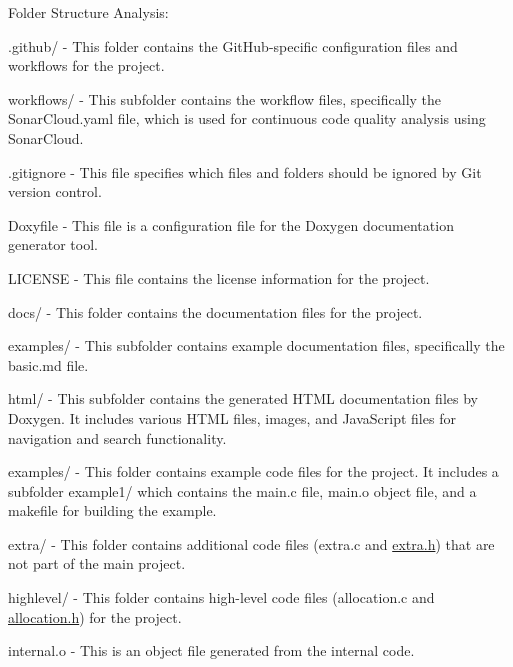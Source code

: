 Folder Structure Analysis\+:


\begin{DoxyItemize}
\item {\ttfamily .github/} -\/ This folder contains the Git\+Hub-\/specific configuration files and workflows for the project.
\begin{DoxyItemize}
\item {\ttfamily workflows/} -\/ This subfolder contains the workflow files, specifically the {\ttfamily Sonar\+Cloud.\+yaml} file, which is used for continuous code quality analysis using Sonar\+Cloud.
\end{DoxyItemize}
\item {\ttfamily .gitignore} -\/ This file specifies which files and folders should be ignored by Git version control.
\item {\ttfamily Doxyfile} -\/ This file is a configuration file for the Doxygen documentation generator tool.
\item {\ttfamily LICENSE} -\/ This file contains the license information for the project.
\item {\ttfamily docs/} -\/ This folder contains the documentation files for the project.
\begin{DoxyItemize}
\item {\ttfamily examples/} -\/ This subfolder contains example documentation files, specifically the {\ttfamily basic.\+md} file.
\item {\ttfamily html/} -\/ This subfolder contains the generated HTML documentation files by Doxygen. It includes various HTML files, images, and Java\+Script files for navigation and search functionality.
\end{DoxyItemize}
\item {\ttfamily examples/} -\/ This folder contains example code files for the project. It includes a subfolder {\ttfamily example1/} which contains the {\ttfamily main.\+c} file, {\ttfamily main.\+o} object file, and a {\ttfamily makefile} for building the example.
\item {\ttfamily extra/} -\/ This folder contains additional code files ({\ttfamily extra.\+c} and {\ttfamily \mbox{\hyperlink{extra_8h_source}{extra.\+h}}}) that are not part of the main project.
\item {\ttfamily highlevel/} -\/ This folder contains high-\/level code files ({\ttfamily allocation.\+c} and {\ttfamily \mbox{\hyperlink{allocation_8h_source}{allocation.\+h}}}) for the project.
\item {\ttfamily internal.\+o} -\/ This is an object file generated from the internal code.

\end{DoxyItemize}
